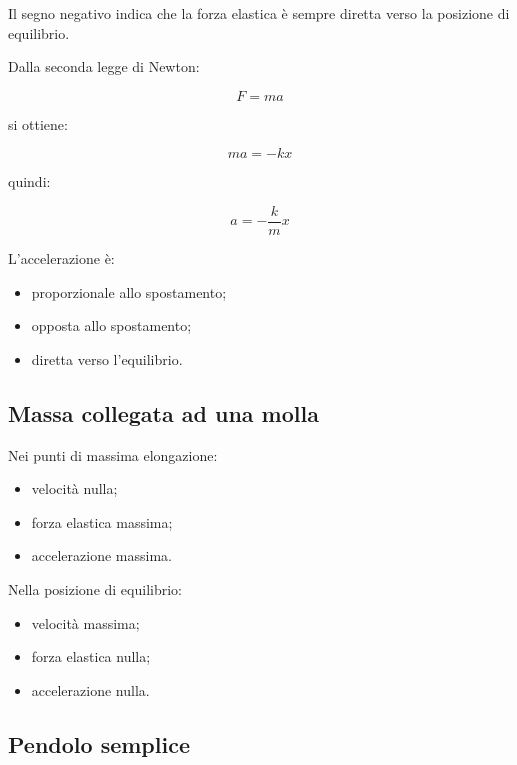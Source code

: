 \noindent Il segno negativo indica che la forza elastica è sempre diretta verso la posizione di equilibrio.

\vspace{0.3cm}

\noindent Dalla seconda legge di Newton:

\[
F=ma
\]

\noindent si ottiene:

\[
ma=-kx
\]

\noindent quindi:

\[
a=-\frac{k}{m}x
\]

\vspace{0.3cm}

\noindent L'accelerazione è:

\begin{itemize}
\item proporzionale allo spostamento;
\item opposta allo spostamento;
\item diretta verso l'equilibrio.
\end{itemize}

\vspace{0.5cm}

\subsection{Massa collegata ad una molla}

\noindent Nei punti di massima elongazione:

\begin{itemize}
\item velocità nulla;
\item forza elastica massima;
\item accelerazione massima.
\end{itemize}

\vspace{0.3cm}

\noindent Nella posizione di equilibrio:

\begin{itemize}
\item velocità massima;
\item forza elastica nulla;
\item accelerazione nulla.
\end{itemize}

\vspace{0.5cm}

\subsection{Pendolo semplice}

